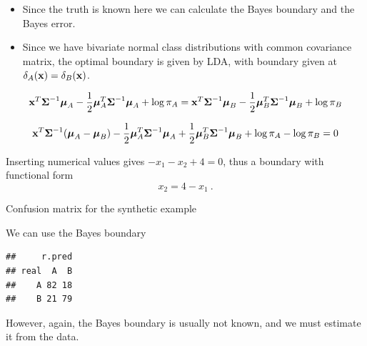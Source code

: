 \documentclass[10pt,ignorenonframetext,]{beamer}
\newenvironment{Shaded}{\begin{snugshade}}{\end{snugshade}}
\newcommand{\KeywordTok}[1]{\textcolor[rgb]{0.13,0.29,0.53}{\textbf{#1}}}
\newcommand{\DataTypeTok}[1]{\textcolor[rgb]{0.13,0.29,0.53}{#1}}
\newcommand{\DecValTok}[1]{\textcolor[rgb]{0.00,0.00,0.81}{#1}}
\newcommand{\StringTok}[1]{\textcolor[rgb]{0.31,0.60,0.02}{#1}}
\newcommand{\OperatorTok}[1]{\textcolor[rgb]{0.81,0.36,0.00}{\textbf{#1}}}
\newcommand{\NormalTok}[1]{#1}
\begin{document}
\begin{frame}

\begin{itemize}
\item
  Since the truth is known here we can calculate the Bayes boundary and
  the Bayes error.
\item
  Since we have bivariate normal class distributions with common
  covariance matrix, the optimal boundary is given by LDA, with boundary
  given at \(\delta_A({\bf x})=\delta_B({\bf x})\).
\end{itemize}

\[{\bf x}^T \boldsymbol{\Sigma}^{-1}\boldsymbol\mu_A - \frac{1}{2}\boldsymbol\mu_A^T \boldsymbol{\Sigma}^{-1}\boldsymbol\mu_A + \log \pi_A={\bf x}^T \boldsymbol{\Sigma}^{-1}\boldsymbol\mu_B - \frac{1}{2}\boldsymbol\mu_B^T \boldsymbol{\Sigma}^{-1}\boldsymbol\mu_B + \log \pi_B\]

\[{\bf x}^T\boldsymbol{\Sigma}^{-1}(\boldsymbol\mu_A -\boldsymbol\mu_B)-\frac{1}{2}\boldsymbol\mu_A^T \boldsymbol{\Sigma}^{-1}\boldsymbol\mu_A +\frac{1}{2}\boldsymbol\mu_B^T \boldsymbol{\Sigma}^{-1}\boldsymbol\mu_B +\log \pi_A-\log \pi_B=0\]

Inserting numerical values gives \(-x_1-x_2+4=0\), thus a boundary with
functional form \[x_2=4-x_1 \ .\]

\end{frame}

\begin{frame}[fragile]

\begin{block}{Confusion matrix for the synthetic example}

\vspace{2mm}

We can use the Bayes boundary

\begin{Shaded}
\end{Shaded}

\begin{verbatim}
##     r.pred
## real  A  B
##    A 82 18
##    B 21 79
\end{verbatim}

However, again, the Bayes boundary is usually not known, and we must
estimate it from the data.

\end{block}

\end{frame}
\end{document}
